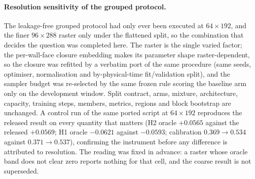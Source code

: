 \documentclass[11pt]{article}
\begin{document}
\paragraph{Resolution sensitivity of the grouped protocol.}
The leakage-free grouped protocol had only ever been executed at $64\times192$, and the finer
$96\times288$ raster only under the flattened split, so the combination that decides the
question was completed here. The raster is the single varied factor; the per-wall-face closure
embedding makes its parameter shape raster-dependent, so the closure was refitted by a verbatim
port of the same procedure (same seeds, optimiser, normalisation and by-physical-time fit/validation
split), and the sampler budget was re-selected by the same frozen rule scoring the baseline arm
only on the development window. Split contract, arms, mixture, architecture, capacity, training
steps, members, metrics, regions and block bootstrap are unchanged. A control run of the same
ported script at $64\times192$ reproduces the released result on every quantity that matters
(H2 oracle $+0.0565$ against the released $+0.0569$; H1 oracle $-0.0621$ against $-0.0593$;
calibration $0.369\to0.534$ against $0.371\to0.537$), confirming the instrument before any
difference is attributed to resolution. The reading was fixed in advance: a raster whose oracle
band does not clear zero reports nothing for that cell, and the coarse result is not superseded.
\end{document}
